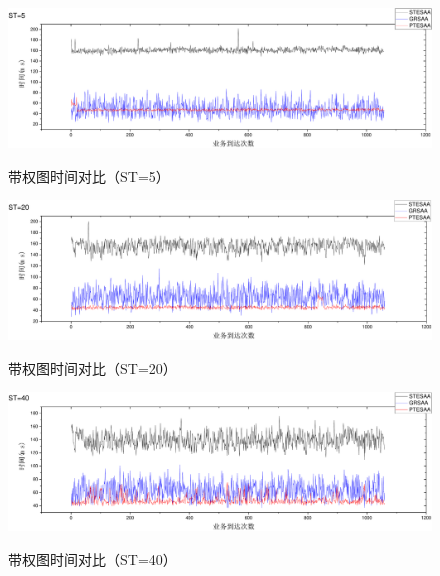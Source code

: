 \begin{figure}
\vspace{-0.5cm}
\setlength{\abovecaptionskip}{-0.5cm}
\begin{center}
{\includegraphics[width=1 \textwidth]{figures/H5T.pdf}}
\end{center}
\caption{{\footnotesize{带权图时间对比（ST=5）}}}
\label{H5T}
\end{figure}
\begin{figure}
\vspace{-0.5cm}
\setlength{\abovecaptionskip}{-0.5cm}
\begin{center}
{\includegraphics[width=1 \textwidth]{figures/H20T.pdf}}
\end{center}
\caption{{\footnotesize{带权图时间对比（ST=20）}}}
\label{H20T}
\end{figure}
\begin{figure}
\vspace{-0.5cm}
\setlength{\abovecaptionskip}{-0.5cm}
\begin{center}
\vspace{-0.05cm}
{\includegraphics[width=1 \textwidth]{figures/H40T.pdf}}
\end{center}
\caption{{\footnotesize{带权图时间对比（ST=40）}}}
\label{H40T}
\end{figure}
